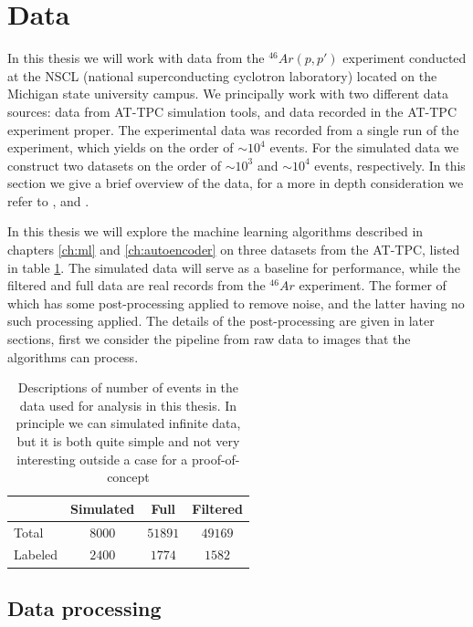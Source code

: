 \section{Data}\label{sec:data}

In this thesis we will work with data from the ${}^{46}Ar(p, p')$ experiment conducted at the NSCL (national superconducting cyclotron laboratory) located on the Michigan state university campus. We principally work with two different data sources: data from AT-TPC simulation tools, and data recorded in the AT-TPC experiment proper. The experimental data was recorded from a single run of the experiment, which yields on the order of $\sim 10^4$ events.	For the simulated data we construct two datasets on the order of $\sim10^3$ and $\sim10^4$ events, respectively. In this section we give a brief overview of the data, for a more in depth consideration we refer to \cite{Mittig2015}, \cite{Suzuki2012} and  \cite{Bradt2017a}. 

In this thesis we will explore the machine learning algorithms described in chapters \ref{ch:ml} and \ref{ch:autoencoder} on three datasets from the AT-TPC, listed in table \ref{tab:datasets}. The simulated data will serve as a baseline for performance, while the filtered and full data are real records from the ${}^{46}Ar$ experiment. The former of which has some post-processing applied to remove noise, and the latter having no such processing applied. The details of the post-processing are given in later sections, first we consider the pipeline from raw data to images that the algorithms can process. 

\begin{table}[H]
\centering
\caption{Descriptions of number of events in the data used for analysis in this thesis. In principle we can simulated infinite data, but it is both quite simple and not very interesting outside a case for a proof-of-concept}\label{tab:datasets}
\begin{tabular}{lccc}
\toprule
{} & Simulated & Full & Filtered \\
\midrule
Total &  $8000$ & $51891$ & $49169$ \\
Labeled & $2400$ & $1774$ &  $1582$ \\ 
\bottomrule
\end{tabular}
\end{table}

\subsection{Data processing}

